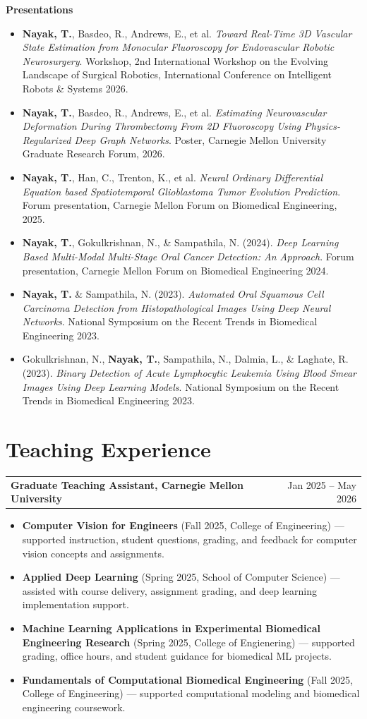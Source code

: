 \documentclass[letterpaper,10pt]{article}
\newcommand{\cvItem}[1]{\item\small{#1}}
\newcommand{\cvProjectHeading}[2]{
  \vspace{2pt}
  \begin{tabularx}{\textwidth}{X r}
    \textbf{#1} & \small #2 \\
  \end{tabularx}
  \vspace{-2pt}
}
\newcommand{\cvItemListStart}{
  \begin{itemize}[leftmargin=0.16in, itemsep=1.5pt, parsep=0pt, topsep=2pt]
}
\newcommand{\cvItemListEnd}{
  \end{itemize}
  \vspace{2pt}
}
\begin{document}
\textbf{Presentations}
\cvItemListStart
    \cvItem{\textbf{Nayak, T.}, Basdeo, R., Andrews, E., et al. \textit{Toward Real-Time 3D Vascular State Estimation from Monocular Fluoroscopy for Endovascular Robotic Neurosurgery}. Workshop, 2nd International Workshop on the Evolving Landscape of Surgical Robotics, International Conference on Intelligent Robots \& Systems 2026.}
  \cvItem{\textbf{Nayak, T.}, Basdeo, R., Andrews, E., et al. \textit{Estimating Neurovascular Deformation During Thrombectomy From 2D Fluoroscopy Using Physics-Regularized Deep Graph Networks}. Poster, Carnegie Mellon University Graduate Research Forum, 2026.}
  \cvItem{\textbf{Nayak, T.}, Han, C., Trenton, K., et al. \textit{Neural Ordinary Differential Equation based Spatiotemporal Glioblastoma Tumor Evolution Prediction}. Forum presentation, Carnegie Mellon Forum on Biomedical Engineering, 2025.}
  \cvItem{\textbf{Nayak, T.}, Gokulkrishnan, N., \& Sampathila, N. (2024). \textit{Deep Learning Based Multi-Modal Multi-Stage Oral Cancer Detection: An Approach}. Forum presentation, Carnegie Mellon Forum on Biomedical Engineering 2024.}
  \cvItem{\textbf{Nayak, T.} \& Sampathila, N. (2023). \textit{Automated Oral Squamous Cell Carcinoma Detection from Histopathological Images Using Deep Neural Networks}. National Symposium on the Recent Trends in Biomedical Engineering 2023.}
  \cvItem{Gokulkrishnan, N., \textbf{Nayak, T.}, Sampathila, N., Dalmia, L., \& Laghate, R. (2023). \textit{Binary Detection of Acute Lymphocytic Leukemia Using Blood Smear Images Using Deep Learning Models}. National Symposium on the Recent Trends in Biomedical Engineering 2023.}
\cvItemListEnd
\section{Teaching Experience}

\cvProjectHeading
  {Graduate Teaching Assistant, Carnegie Mellon University}{Jan 2025 -- May 2026}
\cvItemListStart
  \cvItem{\textbf{Computer Vision for Engineers} (Fall 2025, College of Engineering) --- supported instruction, student questions, grading, and feedback for computer vision concepts and assignments.}
  \cvItem{\textbf{Applied Deep Learning} (Spring 2025, School of Computer Science) --- assisted with course delivery, assignment grading, and deep learning implementation support.}
  \cvItem{\textbf{Machine Learning Applications in Experimental Biomedical Engineering Research} (Spring 2025, College of Engienering) --- supported grading, office hours, and student guidance for biomedical ML projects.}
  \cvItem{\textbf{Fundamentals of Computational Biomedical Engineering} (Fall 2025, College of Engineering) --- supported computational modeling and biomedical engineering coursework.}
\cvItemListEnd
\end{document}
